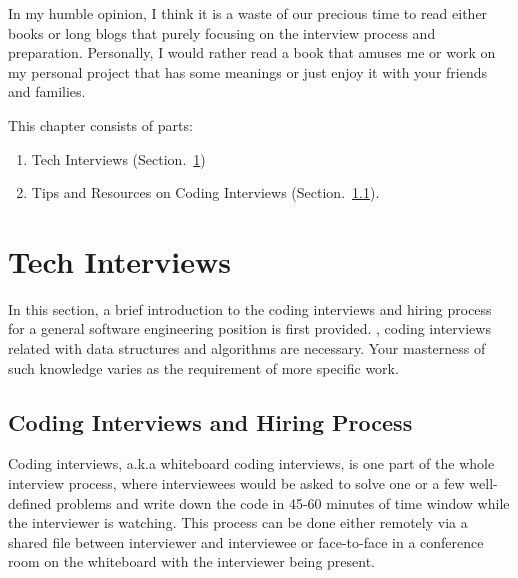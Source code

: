 \documentclass[../main.tex]{subfiles}
\begin{document}
In  my humble opinion, I think it is a waste of our precious time to read either books or long blogs that purely focusing on the interview process and preparation. Personally, I would rather read a book that amuses me or work on my personal project that has some meanings or just enjoy it with your friends and families. 

This chapter consists of parts:
\begin{enumerate}
    \item Tech Interviews (Section.~\ref{section_coding_interview})
    \item Tips and Resources on Coding Interviews (Section.~\ref{}).
\end{enumerate}
\section{Tech Interviews}
\label{section_coding_interview}
In this section, a brief introduction to the coding interviews and hiring process for a general software engineering position is first provided. , coding interviews related with data structures and algorithms are necessary. Your masterness of such knowledge varies as the requirement of more specific work. 

\subsection{Coding Interviews and Hiring Process}
Coding interviews, a.k.a whiteboard coding interviews, is one part of the whole interview process, where interviewees would be asked to solve one or a few well-defined problems and write down the code in 45-60 minutes of time window while the interviewer is watching. This process can be done either remotely via a shared file between interviewer and interviewee or face-to-face in a conference room on the whiteboard with the interviewer being present. 
\end{document}
